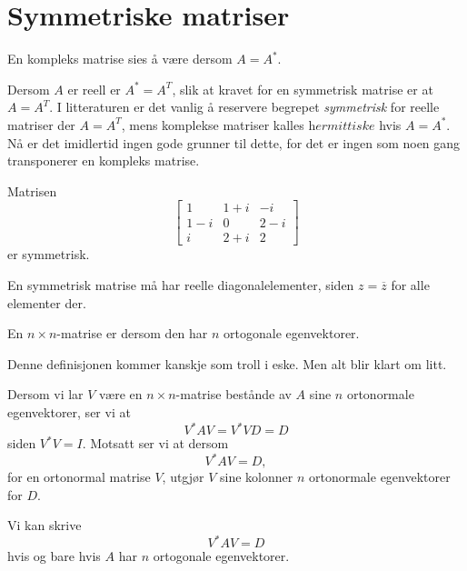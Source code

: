 \section*{Symmetriske matriser}
\begin{defnx}
En kompleks matrise sies å være 
 dersom $A=A^*$. 
\end{defnx}

\begin{merkx}
Dersom $A$ er reell er $A^*=A^T$, slik at kravet for en symmetrisk matrise er at $A=A^T$. 
I litteraturen er det vanlig å reservere begrepet \textit{symmetrisk} for reelle matriser der $A=A^T$, mens komplekse matriser kalles $\textit{hermittiske}$ hvis $A=A^*$. 
Nå er det imidlertid ingen gode grunner til dette, for det er ingen som noen gang transponerer en kompleks matrise. 
\end{merkx}

\begin{ex}
Matrisen
\[
\begin{bmatrix}
1 & 1+i & -i\\  1-i &0 & 2-i \\ i & 2+i  & 2
\end{bmatrix}
\]
er symmetrisk.
\end{ex}

\begin{merkx}
En symmetrisk matrise må har reelle diagonalelementer, siden $z=\overline z$ for alle elementer der.
\end{merkx}

\begin{defnx}
En $n \times n$-matrise er  dersom den har $n$ ortogonale egenvektorer.
\end{defnx}

\begin{merkx}
Denne definisjonen kommer kanskje som troll i eske. Men alt blir klart om litt.
\end{merkx}

Dersom vi lar $V$ være en $n \times n$-matrise bestånde av $A$ sine $n$ ortonormale egenvektorer, 
ser vi at 
\[
V^* A V =V^* VD =D
\]
siden $V^* V=I$. Motsatt ser vi at dersom
\[
V^* A V =D,
\]
for en ortonormal matrise $V$, utgjør $V$ sine kolonner  $n$ ortonormale egenvektorer for $D$.

\begin{thm}
Vi kan skrive 
\[
V^*AV=D
\]
hvis og bare hvis $A$ har $n$ ortogonale egenvektorer. 
\end{thm}


